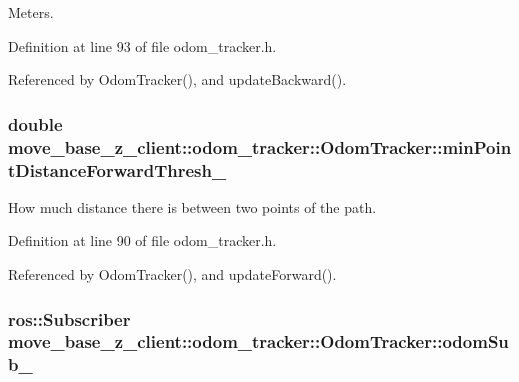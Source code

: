Meters. 



Definition at line 93 of file odom\+\_\+tracker.\+h.



Referenced by Odom\+Tracker(), and update\+Backward().

\subsubsection[{\texorpdfstring{min\+Point\+Distance\+Forward\+Thresh\+\_\+}{minPointDistanceForwardThresh_}}]{\setlength{\rightskip}{0pt plus 5cm}double move\+\_\+base\+\_\+z\+\_\+client\+::odom\+\_\+tracker\+::\+Odom\+Tracker\+::min\+Point\+Distance\+Forward\+Thresh\+\_\+\hspace{0.3cm}{\ttfamily [protected]}}\hypertarget{classmove__base__z__client_1_1odom__tracker_1_1OdomTracker_ac306033eff926950e9b9a16e05a0c639}{}\label{classmove__base__z__client_1_1odom__tracker_1_1OdomTracker_ac306033eff926950e9b9a16e05a0c639}


How much distance there is between two points of the path. 



Definition at line 90 of file odom\+\_\+tracker.\+h.



Referenced by Odom\+Tracker(), and update\+Forward().

\subsubsection[{\texorpdfstring{odom\+Sub\+\_\+}{odomSub_}}]{\setlength{\rightskip}{0pt plus 5cm}ros\+::\+Subscriber move\+\_\+base\+\_\+z\+\_\+client\+::odom\+\_\+tracker\+::\+Odom\+Tracker\+::odom\+Sub\+\_\+\hspace{0.3cm}{\ttfamily [protected]}}\hypertarget{classmove__base__z__client_1_1odom__tracker_1_1OdomTracker_a6a6b1dcb9f0cfae01007ca949b562ee2}{}\label{classmove__base__z__client_1_1odom__tracker_1_1OdomTracker_a6a6b1dcb9f0cfae01007ca949b562ee2}


